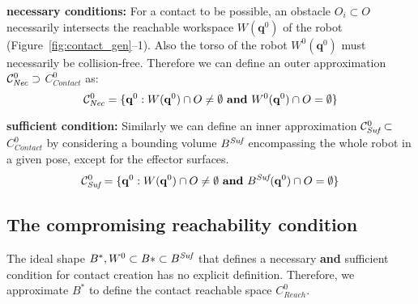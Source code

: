 \textbf{necessary conditions:}
For a contact to be possible, an obstacle $O_i \subset O$ necessarily intersects the reachable workspace $W(\mathbf{q}^{0})$ of the robot (Figure~\ref{fig:contact_gen}--1). Also the torso of the robot $W^0(\mathbf{q}^{0})$ must necessarily be collision-free.
Therefore we can define an outer approximation  $ \mathcal{C}^0_{\textrm{\it Nec}} \supset$ $C_{Contact}^0$ as: 
\begin{equation}
\mathcal{C}^0_{\textrm{\it Nec}} = \{ \mathbf{q}^0 : W(\mathbf{q}^{0}) \cap O \neq \emptyset \textrm{ \textbf{and}}\ W^0(\mathbf{q}^{0}) \cap O = \emptyset \} %
\end{equation}
 

\textbf{sufficient condition:}
Similarly we can define an inner approximation \mbox{$\mathcal{C}^0_{\textrm{\it Suf}} \subset $ $C_{Contact}^0$} by considering a bounding volume $B^{\textrm{\it Suf}}$ encompassing the whole robot in a given pose, except for the effector surfaces. 
\begin{equation}
\mathcal{C}^0_{\textrm{\it Suf}} = \{ \mathbf{q}^0 : W(\mathbf{q}^{0}) \cap O \neq \emptyset \textrm{ \textbf{and}}\ B^{\textrm{\it Suf}}(\mathbf{q}^{0}) \cap O = \emptyset \} %
\end{equation}


\subsection{The compromising reachability condition}
\label{sec:scaling}
The ideal shape $B^*, W^0 \subset B* \subset B^{\textrm{\it Suf}}$ that defines a necessary \textbf{and} sufficient condition for contact creation has no explicit definition.
Therefore, we approximate $B^*$ to define the contact reachable space $C_{Reach}^0$.

